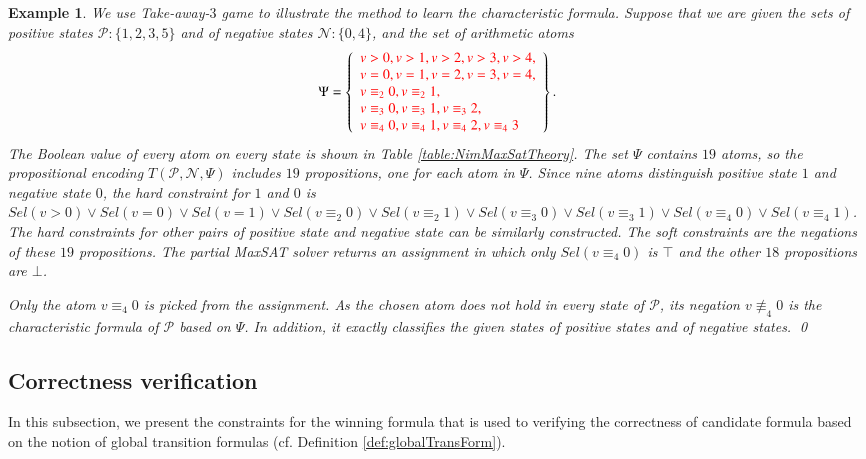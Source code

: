 \documentclass[review]{elsarticle}
\newcommand{\set}[1]{\{ #1 \}}
\newcommand{\true}{\top}
\newcommand{\false}{\bot}
\newcommand{\positiveSet}{\mathcal{P}}
\newcommand{\negativeSet}{\mathcal{N}}
\newcommand{\modulo}{\equiv}
\newcommand{\nmodulo}{\not \equiv}
\newcommand{\featureSet}{\Psi}
\newtheorem{example}{Example}
\begin{document}
    \begin{example} \label{exm:NimMaxSatTheory} \rm 
        We use Take-away-$3$ game to illustrate the method to learn the characteristic formula.
        Suppose that we are given the sets of positive states $\positiveSet: \set{1, 2, 3, 5}$ and of negative states $\negativeSet: \set{0, 4}$, and the set of arithmetic atoms
		\[
		\Psi = \left\{
		\begin{array}{l}
		{\color{red}v > 0, v > 1, v > 2, v > 3, v > 4,}\\
		{\color{red}v = 0, v = 1, v = 2, v = 3, v = 4,}\\
		{\color{red}v \modulo_2 0, v \modulo_2 1,}\\
		{\color{red}v \modulo_3 0, v \modulo_3 1, v \modulo_3 2,}\\
		{\color{red}v \modulo_4 0, v \modulo_4 1, v \modulo_4 2, v \modulo_4 3}
		\end{array}
		\right\}.
		\]
		The Boolean value of every atom on every state is shown in Table \ref{table:NimMaxSatTheory}.
		The set $\Psi$ contains $19$ atoms, so the propositional encoding $T(\positiveSet, \negativeSet, \featureSet)$ includes $19$ propositions, one for each atom in $\Psi$.
		Since nine atoms distinguish positive state $1$ and negative state $0$, the hard constraint for $1$ and $0$ is
		{\color{red}$Sel(v > 0) \lor Sel(v = 0) \lor Sel(v = 1) \lor Sel(v \modulo_2 0) \lor Sel(v \modulo_2 1) \lor
		Sel(v \modulo_3 0) \lor Sel(v \modulo_3 1) \lor Sel(v \modulo_4 0) \lor Sel(v \modulo_4 1)$.}
		The hard constraints for other pairs of positive state and negative state can be similarly constructed.
		The soft constraints are the negations of these $19$ propositions.
		The partial MaxSAT solver returns an assignment in which only {\color{red}$Sel(v \modulo_4 0)$} is $\true$ and the other $18$ propositions are $\false$.
	
		Only the atom $v \modulo_4 0$ is picked from the assignment.
		As the chosen atom does not hold in every state of $\positiveSet$, its negation $v \nmodulo_4 0$ is the characteristic formula of $\positiveSet$ based on $\Psi$.
		In addition, it exactly classifies the given states of positive states and of negative states. \qed			
     \end{example}
     
\subsection{Correctness verification} \label{sec:winFormCorVer}
    In this subsection, we present the constraints for the winning formula that is used to verifying the correctness of candidate formula based on the notion of global transition formulas (cf. Definition \ref{def:globalTransForm}).
	
\end{document}
